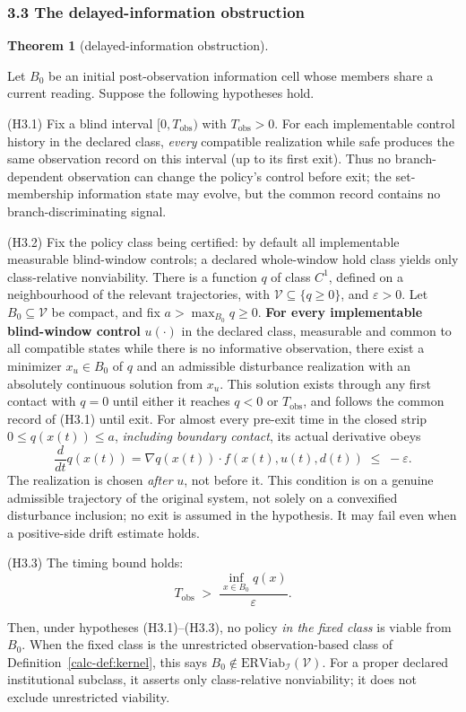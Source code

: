 \documentclass[10pt,twocolumn]{article}
\theoremstyle{definition}
\newtheorem{theorem}{Theorem}
\begin{document}
\subsubsection{3.3 The delayed-information
obstruction}\label{calc-the-delayed-information-obstruction}

\begin{theorem}[delayed-information obstruction]\label{calc-thm:delayed}

Let \(B_0\) be an initial post-observation information cell whose
members share a current reading. Suppose the following
hypotheses hold.

(H3.1) Fix a blind interval \([0,T_{\mathrm{obs}})\) with
\(T_{\mathrm{obs}}>0\). For each implementable control history in the
declared class, \emph{every} compatible realization while safe produces
the same observation record on this interval (up to its first exit).
Thus no branch-dependent observation can change the policy's control
before exit; the set-membership information state may evolve, but the
common record contains no branch-discriminating signal.

(H3.2) Fix the policy class being certified: by default all implementable measurable blind-window controls; a declared whole-window hold class yields only class-relative nonviability. There is a function \(q\) of class \(C^1\), defined on a neighbourhood of
the relevant trajectories, with \(\mathcal V\subseteq\{q\ge0\}\),
and \(\varepsilon>0\). Let \(B_0\subseteq\mathcal V\) be compact,
and fix \(a>\max_{B_0}q\ge0\).
\textbf{For every implementable blind-window control} \(u(\cdot)\) in the
declared class, measurable and common to all compatible states while
there is no informative observation, there exist a minimizer
\(x_u\in B_0\) of \(q\) and an admissible disturbance realization
with an absolutely continuous solution from \(x_u\). This solution
exists through any first contact with \(q=0\) until either it reaches
\(q<0\) or \(T_{\mathrm{obs}}\), and follows the common record
of (H3.1) until exit. For almost every pre-exit time in the closed strip
\(0\le q(x(t))\le a\), \emph{including boundary contact},
its actual derivative obeys
\[\frac{d}{dt}q(x(t))=\nabla q(x(t))\cdot f(x(t),u(t),d(t))
\;\le\;-\varepsilon. \tag{2}\]
The realization is chosen \emph{after} \(u\), not before it. This
condition is on a genuine admissible trajectory of the original system,
not solely on a convexified disturbance inclusion; no exit is assumed
in the hypothesis. It may fail even when a positive-side drift estimate
holds.

(H3.3) The timing bound holds:
\[T_{\mathrm{obs}} \;>\; \frac{\inf_{x \in B_0} q(x)}{\varepsilon}. \tag{3}\]

Then, under hypotheses (H3.1)--(H3.3), no policy \emph{in the
fixed class} is viable from \(B_0\). When the fixed class is the
unrestricted observation-based class of Definition~\ref{calc-def:kernel},
this says \(B_0\notin\mathrm{ERViab}_{\mathcal I}(\mathcal V)\).
For a proper declared institutional subclass, it asserts only
class-relative nonviability; it does not exclude unrestricted viability.

\end{theorem}
\end{document}
